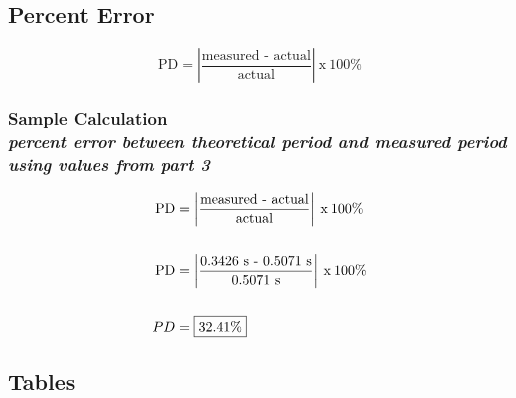 \subsection{Percent Error}
\vspace{0.5cm}
\begin{equation}
	\text{PD}	= \left| \frac{\text{measured - actual}}{\text{actual}} \right|\: \text{x}\: 100\%
	\label{eq:perror}
\end{equation}

\subsubsection{Sample Calculation \\ {\normalfont \small\textit{percent error between theoretical period and measured period using values from part 3}}}

\begin{align*}
	\text{PD}	&= \left| \frac{\text{measured - actual}}{\text{actual}} \right|\: \text{x}\: 100\% \\ \\
	\text{PD}	&= \left| \frac{\text{0.3426\text{ s} - 0.5071\text{ s}}}{\text{0.5071\text{ s}}} \right|\: \text{x}\: 100\% \\ \\
			PD &= \boxed{32.41\%} 
\end{align*}

\subsection{Tables}

\begin{table}[H]
\centering
\captionsetup{font=Large}
\caption{Part 1 }
\label{tab:part1Tab}
\end{table}

